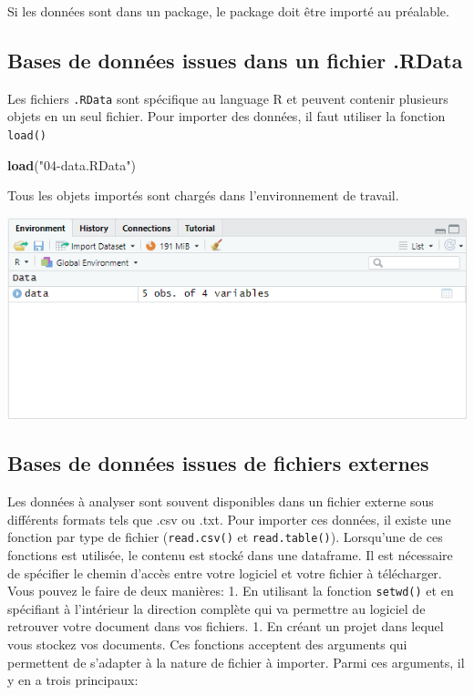 \documentclass[
]{book}
\newenvironment{Shaded}{\begin{snugshade}}{\end{snugshade}}
\newcommand{\FunctionTok}[1]{\textcolor[rgb]{0.13,0.29,0.53}{\textbf{#1}}}
\newcommand{\NormalTok}[1]{#1}
\newcommand{\StringTok}[1]{\textcolor[rgb]{0.31,0.60,0.02}{#1}}
\begin{document}
Si les données sont dans un package, le package doit être importé au préalable.

\subsection{Bases de données issues dans un fichier .RData}\label{bases-de-donnuxe9es-issues-dans-un-fichier-.rdata}

Les fichiers \texttt{.RData} sont spécifique au language R et peuvent contenir plusieurs objets en un seul fichier. Pour importer des données, il faut utiliser la fonction \texttt{load()}

\begin{Shaded}
\begin{Highlighting}[]
\FunctionTok{load}\NormalTok{(}\StringTok{"04{-}data.RData"}\NormalTok{)}
\end{Highlighting}
\end{Shaded}

Tous les objets importés sont chargés dans l'environnement de travail.

\includegraphics[width=8.47in]{images/environment_forRDataDownload}

\subsection{Bases de données issues de fichiers externes}\label{bases-de-donnuxe9es-issues-de-fichiers-externes}

Les données à analyser sont souvent disponibles dans un fichier externe sous différents formats tels que .csv ou .txt. Pour importer ces données, il existe une fonction par type de fichier (\texttt{read.csv()} et \texttt{read.table()}). Lorsqu'une de ces fonctions est utilisée, le contenu est stocké dans une dataframe. Il est nécessaire de spécifier le chemin d'accès entre votre logiciel et votre fichier à télécharger. Vous pouvez le faire de deux manières:
1. En utilisant la fonction \texttt{setwd()} et en spécifiant à l'intérieur la direction complète qui va permettre au logiciel de retrouver votre document dans vos fichiers.
1. En créant un projet dans lequel vous stockez vos documents.
Ces fonctions acceptent des arguments qui permettent de s'adapter à la nature de fichier à importer. Parmi ces arguments, il y en a trois principaux:
\end{document}
